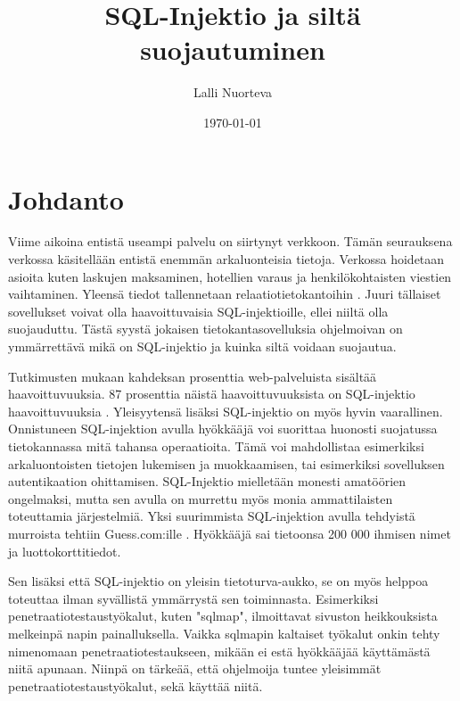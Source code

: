 \documentclass[finnish]{tktltiki2}
\title{SQL-Injektio ja siltä suojautuminen}
\author{Lalli Nuorteva}
\date{\today}
\theoremstyle{definition}
\theoremstyle{remark}
\begin{document}
	
	\frontmatter      %
	
	\maketitle        %
	
	\makeabstract
	
	\tableofcontents  %
	
	
	\mainmatter       %
	
	\section{Johdanto}
	Viime aikoina entistä useampi palvelu on siirtynyt verkkoon. Tämän seurauksena verkossa käsitellään entistä enemmän arkaluonteisia tietoja. Verkossa hoidetaan asioita kuten laskujen maksaminen, hotellien varaus ja henkilökohtaisten viestien vaihtaminen. Yleensä tiedot tallennetaan relaatiotietokantoihin \cite{Suosituin}. Juuri tällaiset sovellukset voivat olla haavoittuvaisia SQL-injektioille, ellei niiltä olla suojauduttu. Tästä syystä jokaisen tietokantasovelluksia ohjelmoivan on ymmärrettävä mikä on SQL-injektio ja kuinka siltä voidaan suojautua.
	
	Tutkimusten mukaan kahdeksan prosenttia web-palveluista sisältää haavoittuvuuksia.  87 prosenttia näistä haavoittuvuuksista on SQL-injektio haavoittuvuuksia \cite{detection}. Yleisyytensä lisäksi SQL-injektio on myös hyvin vaarallinen. Onnistuneen SQL-injektion avulla hyökkääjä voi suorittaa huonosti suojatussa tietokannassa mitä tahansa operaatioita. Tämä voi mahdollistaa esimerkiksi arkaluontoisten tietojen lukemisen ja muokkaamisen, tai esimerkiksi sovelluksen autentikaation ohittamisen. SQL-Injektio mielletään monesti amatöörien ongelmaksi, mutta sen avulla on murrettu myös monia ammattilaisten toteuttamia järjestelmiä. Yksi suurimmista SQL-injektion avulla tehdyistä murroista tehtiin Guess.com:ille \cite{guess}. Hyökkääjä sai tietoonsa 200 000 ihmisen nimet ja luottokorttitiedot.
	
	Sen lisäksi että SQL-injektio on yleisin tietoturva-aukko, se on myös helppoa toteuttaa ilman syvällistä ymmärrystä sen toiminnasta. Esimerkiksi penetraatiotestaustyökalut, kuten "sqlmap"\space, ilmoittavat sivuston heikkouksista melkeinpä napin painalluksella. Vaikka sqlmapin kaltaiset työkalut onkin tehty nimenomaan penetraatiotestaukseen, mikään ei estä hyökkääjää käyttämästä niitä apunaan. Niinpä on tärkeää, että ohjelmoija tuntee yleisimmät penetraatiotestaustyökalut, sekä käyttää niitä.
	
\end{document}
